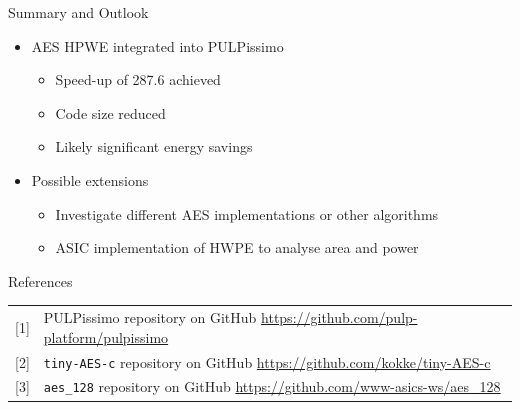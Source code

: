 \documentclass[aspectratio=169, nobackgroundmain]{beamer}
\begin{document}
\begin{frame}[fragile]{Summary and Outlook}

  \begin{itemize}
      \item AES HPWE integrated into PULPissimo \begin{itemize}
        \item Speed-up of 287.6 achieved
        \item Code size reduced
        \item Likely significant energy savings
      \end{itemize}
  \end{itemize}  

  \begin{itemize}
    \item Possible extensions \begin{itemize}
      \item Investigate different AES implementations or other algorithms
      \item ASIC implementation of HWPE to analyse area and power
    \end{itemize}
\end{itemize}  
\end{frame}


\begin{frame}[fragile]{References}
  \fontsize{11pt}{10}\selectfont
    \begin{tabular}{p{1cm}p{12cm}}
      {[1]} & PULPissimo repository on GitHub \url{https://github.com/pulp-platform/pulpissimo} \\
      {[2]} & \verb|tiny-AES-c| repository on GitHub \url{https://github.com/kokke/tiny-AES-c} \\
      {[3]} & \verb|aes_128| repository on GitHub \url{https://github.com/www-asics-ws/aes_128}\\
    \end{tabular}
  \end{frame}


\end{document}
